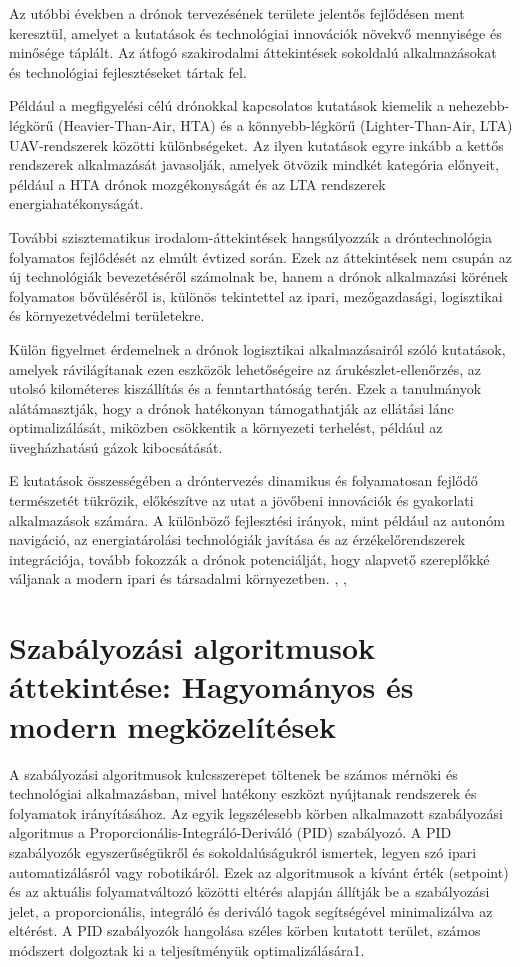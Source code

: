 Az utóbbi években a drónok tervezésének területe jelentős fejlődésen ment keresztül, amelyet a kutatások és technológiai innovációk növekvő mennyisége és minősége táplált. Az átfogó szakirodalmi áttekintések sokoldalú alkalmazásokat és technológiai fejlesztéseket tártak fel.

Például a megfigyelési célú drónokkal kapcsolatos kutatások kiemelik a nehezebb-légkörű (Heavier-Than-Air, HTA) és a könnyebb-légkörű (Lighter-Than-Air, LTA) UAV-rendszerek közötti különbségeket. Az ilyen kutatások egyre inkább a kettős rendszerek alkalmazását javasolják, amelyek ötvözik mindkét kategória előnyeit, például a HTA drónok mozgékonyságát és az LTA rendszerek energiahatékonyságát.

További szisztematikus irodalom-áttekintések hangsúlyozzák a dróntechnológia folyamatos fejlődését az elmúlt évtized során. Ezek az áttekintések nem csupán az új technológiák bevezetéséről számolnak be, hanem a drónok alkalmazási körének folyamatos bővüléséről is, különös tekintettel az ipari, mezőgazdasági, logisztikai és környezetvédelmi területekre.

Külön figyelmet érdemelnek a drónok logisztikai alkalmazásairól szóló kutatások, amelyek rávilágítanak ezen eszközök lehetőségeire az árukészlet-ellenőrzés, az utolsó kilométeres kiszállítás és a fenntarthatóság terén. Ezek a tanulmányok alátámasztják, hogy a drónok hatékonyan támogathatják az ellátási lánc optimalizálását, miközben csökkentik a környezeti terhelést, például az üvegházhatású gázok kibocsátását.

E kutatások összességében a dróntervezés dinamikus és folyamatosan fejlődő természetét tükrözik, előkészítve az utat a jövőbeni innovációk és gyakorlati alkalmazások számára. A különböző fejlesztési irányok, mint például az autonóm navigáció, az energiatárolási technológiák javítása és az érzékelőrendszerek integrációja, tovább fokozzák a drónok potenciálját, hogy alapvető szereplőkké váljanak a modern ipari és társadalmi környezetben.
\cite{tadic2021application}, \cite{doornbos2024drone}, \cite{adorni2021literature}

\section{Szabályozási algoritmusok áttekintése: Hagyományos és modern megközelítések}

A szabályozási algoritmusok kulcsszerepet töltenek be számos mérnöki és technológiai alkalmazásban, mivel hatékony eszközt nyújtanak rendszerek és folyamatok irányításához. Az egyik legszélesebb körben alkalmazott szabályozási algoritmus a Proporcionális-Integráló-Deriváló (PID) szabályozó. A PID szabályozók egyszerűségükről és sokoldalúságukról ismertek, legyen szó ipari automatizálásról vagy robotikáról. Ezek az algoritmusok a kívánt érték (setpoint) és az aktuális folyamatváltozó közötti eltérés alapján állítják be a szabályozási jelet, a proporcionális, integráló és deriváló tagok segítségével minimalizálva az eltérést. A PID szabályozók hangolása széles körben kutatott terület, számos módszert dolgoztak ki a teljesítményük optimalizálására1.

